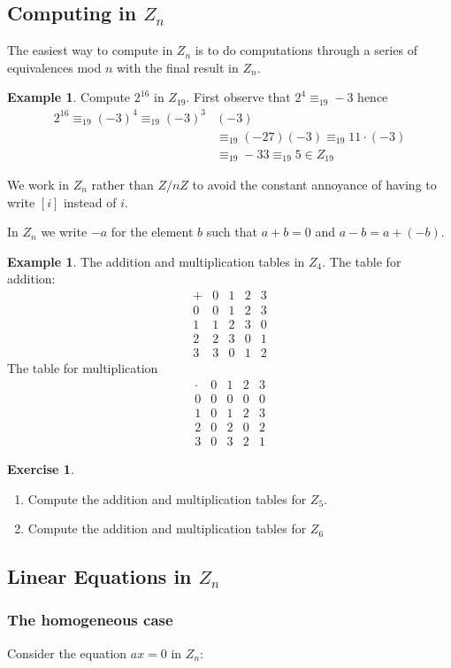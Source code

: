 \documentclass[12pt]{amsart}
\newcommand{\benu}{\begin{enumerate}}
\newcommand{\eenu}{\end{enumerate}}
\theoremstyle{definition}
\newtheorem{exercise}[theorem]{Exercise}
\newcommand{\bex}{\begin{exercise}}
\newcommand{\ex}{\end{exercise}}
\newtheorem{example}[theorem]{Example}
\newcommand{\bax}{\begin{example}}
\newcommand{\ax}{\end{example}}
\begin{document}
\subsection{Computing in $Z_n$}
The easiest  way to compute in $Z_n$ is to do computations through a series of  equivalences mod $n$ with the final result in $Z_n$.
\bax Compute $2^{16}$ in $Z_{19}$. First observe that $2^4\equiv_{19} -3$ hence 
\begin{equation*} \begin{split}
2^{16}\equiv_{19}(-3)^4  \equiv_{19}(-3)^{3}&(-3)\\ &\equiv_{19}(-27)(-3)   \equiv_{19}11\cdot  (-3)\\
&\equiv_{19} -33 \equiv_{19}5\in Z_{19}
\end{split}
\end{equation*}
\ax
We work in $Z_n$ rather than $Z/nZ$ to avoid the constant annoyance of having to write $[i]$ instead of $i$.

In $Z_n$ we write $-a$ for the element $b$ such that $a+b=0$ and $a-b=a+(-b)$.

\bax The addition and multiplication tables in $Z_4$. 
The table for addition:
\begin{equation*}
\begin{array}{c|cccc}
+ & 0 & 1&2 & 3\\
\hline
0 & 0& 1& 2 & 3\\
1& 1 &2&3&0\\
2 &2 &3&0&1\\
3 &3&0 & 1 &2
\end{array}
\end{equation*}
The table for multiplication
\begin{equation*}
\begin{array}{c|cccc}
\cdot &0&1&2&3\\
\hline
0&0&0&0&0\\
1&0&1&2&3\\
2 &0&2&0&2\\
3 &0&3&2&1
\end{array}
\end{equation*}
\ax
\bex
\benu \item Compute the addition and multiplication tables for $Z_5$.
\item Compute the addition and multiplication tables for $Z_6$
\eenu
\ex
\subsection{Linear Equations in $Z_n$}
\subsubsection{The homogeneous case}
Consider the equation $ax=0$ in $Z_n$:
\end{document}
